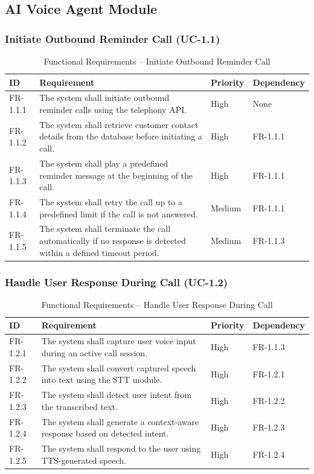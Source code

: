 \documentclass[12pt,a4paper]{report}
\begin{document}
\subsection{AI Voice Agent Module}

\subsubsection{Initiate Outbound Reminder Call (UC-1.1)}

\begin{table}[H]
\centering
\caption{Functional Requirements – Initiate Outbound Reminder Call}
\begin{tabularx}{\textwidth}{|l|X|l|l|}
\hline
\textbf{ID} & \textbf{Requirement} & \textbf{Priority} & \textbf{Dependency} \\ \hline
FR-1.1.1 & The system shall initiate outbound reminder calls using the telephony API. & High & None \\ \hline
FR-1.1.2 & The system shall retrieve customer contact details from the database before initiating a call. & High & FR-1.1.1 \\ \hline
FR-1.1.3 & The system shall play a predefined reminder message at the beginning of the call. & High & FR-1.1.1 \\ \hline
FR-1.1.4 & The system shall retry the call up to a predefined limit if the call is not answered. & Medium & FR-1.1.1 \\ \hline
FR-1.1.5 & The system shall terminate the call automatically if no response is detected within a defined timeout period. & Medium & FR-1.1.3 \\ \hline
\end{tabularx}
\end{table}
\subsubsection{Handle User Response During Call (UC-1.2)}

\begin{table}[H]
\centering
\caption{Functional Requirements – Handle User Response During Call}
\begin{tabularx}{\textwidth}{|l|X|l|l|}
\hline
\textbf{ID} & \textbf{Requirement} & \textbf{Priority} & \textbf{Dependency} \\ \hline
FR-1.2.1 & The system shall capture user voice input during an active call session. & High & FR-1.1.3 \\ \hline
FR-1.2.2 & The system shall convert captured speech into text using the STT module. & High & FR-1.2.1 \\ \hline
FR-1.2.3 & The system shall detect user intent from the transcribed text. & High & FR-1.2.2 \\ \hline
FR-1.2.4 & The system shall generate a context-aware response based on detected intent. & High & FR-1.2.3 \\ \hline
FR-1.2.5 & The system shall respond to the user using TTS-generated speech. & High & FR-1.2.4 \\ \hline
\end{tabularx}
\end{table}
\end{document}
